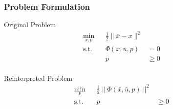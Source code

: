\begin{frame}
    \frametitle{Problem Formulation}

    Original Problem
    \begin{align*}
        \min_{x,p} & & \frac{1}{2} \| \bar{x} - x \|^2 & & \\
        \operatorname{s.t.} & & \Phi(x,\bar{u},p) & = 0 & & \\
                            & & p & \geq 0 & & \\
    \end{align*}

    Reinterpreted Problem
    \begin{align*}
        \min_{p}  & & \frac{1}{2} \| \Phi(\bar{x},\bar{u},p) \|^2 & & \\
        \operatorname{s.t.} & & p & \geq 0 & & \\
    \end{align*}
\end{frame}

